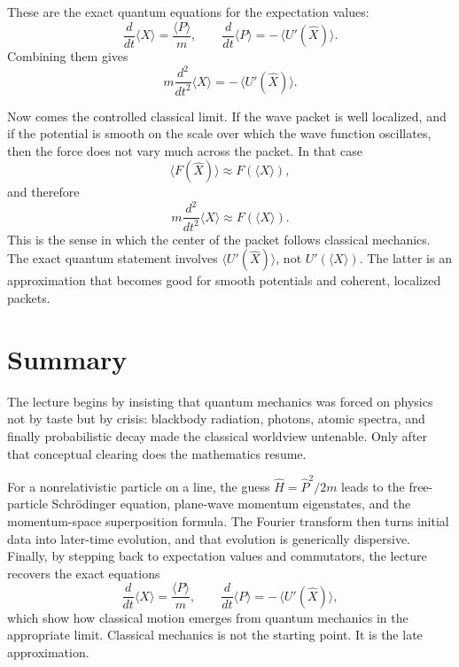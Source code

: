 These are the exact quantum equations for the expectation values:
\begin{equation}
\frac{d}{dt}\langle X\rangle=\frac{\langle P\rangle}{m},
\qquad
\frac{d}{dt}\langle P\rangle=-\,\langle U'(\hat X)\rangle.
\end{equation}
Combining them gives
\begin{equation}
m\frac{d^2}{dt^2}\langle X\rangle = -\,\langle U'(\hat X)\rangle.
\end{equation}

Now comes the controlled classical limit. If the wave packet is well localized, and if the potential is smooth on the scale over which the wave function oscillates, then the force does not vary much across the packet. In that case
\begin{equation}
\langle F(\hat X)\rangle \approx F(\langle X\rangle),
\end{equation}
and therefore
\begin{equation}
m\frac{d^2}{dt^2}\langle X\rangle \approx F(\langle X\rangle).
\end{equation}
This is the sense in which the center of the packet follows classical mechanics. The exact quantum statement involves \(\langle U'(\hat X)\rangle\), not \(U'(\langle X\rangle)\). The latter is an approximation that becomes good for smooth potentials and coherent, localized packets.

\section{Summary}

The lecture begins by insisting that quantum mechanics was forced on physics not by taste but by crisis: blackbody radiation, photons, atomic spectra, and finally probabilistic decay made the classical worldview untenable. Only after that conceptual clearing does the mathematics resume.

For a nonrelativistic particle on a line, the guess \(\hat H=\hat P^2/2m\) leads to the free-particle Schr\"odinger equation, plane-wave momentum eigenstates, and the momentum-space superposition formula. The Fourier transform then turns initial data into later-time evolution, and that evolution is generically dispersive. Finally, by stepping back to expectation values and commutators, the lecture recovers the exact equations
\[
\frac{d}{dt}\langle X\rangle=\frac{\langle P\rangle}{m},
\qquad
\frac{d}{dt}\langle P\rangle=-\,\langle U'(\hat X)\rangle,
\]
which show how classical motion emerges from quantum mechanics in the appropriate limit. Classical mechanics is not the starting point. It is the late approximation.
